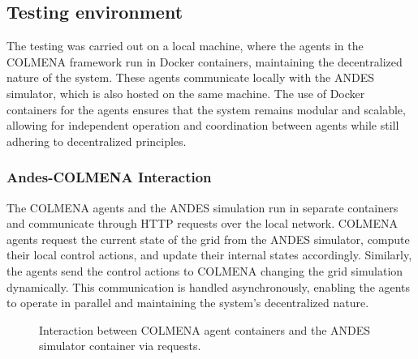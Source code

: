 \documentclass{article}
\begin{document}
\subsection{Testing environment}

The testing was carried out on a local machine, where the agents in the COLMENA framework run in Docker containers, maintaining the decentralized nature of the system. These agents communicate locally with the ANDES simulator, which is also hosted on the same machine. The use of Docker containers for the agents ensures that the system remains modular and scalable, allowing for independent operation and coordination between agents while still adhering to decentralized principles. 

\subsubsection{Andes-COLMENA Interaction}

The COLMENA agents and the ANDES simulation run in separate containers and communicate through HTTP requests over the local network. COLMENA agents request the current state of the grid from the ANDES simulator, compute their local control actions, and update their internal states accordingly. Similarly, the agents send the control actions to COLMENA changing the grid simulation dynamically. This communication is handled asynchronously, enabling the agents to operate in parallel and maintaining the system’s decentralized nature.


\begin{figure}[h]
  \centering
  \caption{Interaction between COLMENA agent containers and the ANDES simulator container via requests.}
  \label{fig:andes-colmena-diagram}
\end{figure}
\end{document}
